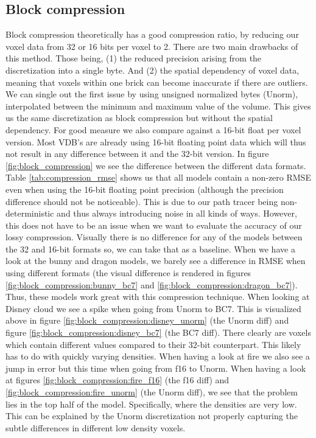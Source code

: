 \subsection{Block compression} \label{results:block_compression}
Block compression theoretically has a good compression ratio, by reducing our voxel data from 32 or 16 bits per voxel to 2. There are two main drawbacks of this method. Those being, (1) the reduced precision arising from the discretization into a single byte. And (2) the spatial dependency of voxel data, meaning that voxels within one brick can become inaccurate if there are outliers. We can single out the first issue by using unsigned normalized bytes (Unorm), interpolated between the minimum and maximum value of the volume. This gives us the same discretization as block compression but without the spatial dependency. For good measure we also compare against a 16-bit float per voxel version. Most VDB's are already using 16-bit floating point data which will thus not result in any difference between it and the 32-bit version. In figure \ref{fig:block_compression} we see the difference between the different data formats. Table \ref{tab:compression_rmse} shows us that all models contain a non-zero RMSE even when using the 16-bit floating point precision (although the precision difference should not be noticeable). This is due to our path tracer being non-deterministic and thus always introducing noise in all kinds of ways. However, this does not have to be an issue when we want to evaluate the accuracy of our lossy compression. Visually there is no difference for any of the models between the 32 and 16-bit formats so, we can take that as a baseline. When we have a look at the bunny and dragon models, we barely see a difference in RMSE when using different formats (the visual difference is rendered in figures \ref{fig:block_compression:bunny_bc7} and \ref{fig:block_compression:dragon_bc7}). Thus, these models work great with this compression technique. When looking at Disney cloud we see a spike when going from Unorm to BC7. This is visualized above in figure \ref{fig:block_compression:disney_unorm} (the Unorm diff) and figure \ref{fig:block_compression:disney_bc7} (the BC7 diff). There clearly are voxels which contain different values compared to their 32-bit counterpart. This likely has to do with quickly varying densities. When having a look at fire we also see a jump in error but this time when going from f16 to Unorm. When having a look at figures \ref{fig:block_compression:fire_f16} (the f16 diff) and \ref{fig:block_compression:fire_unorm} (the Unorm diff), we see that the problem lies in the top half of the model. Specifically, where the densities are very low. This can be explained by the Unorm discretization not properly capturing the subtle differences in different low density voxels. 

